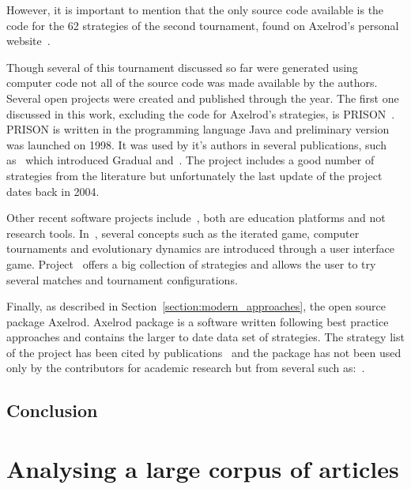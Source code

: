 \documentclass{article}
\theoremstyle{definition}
\begin{document}
However, it is important to mention that the only source code available is the code
for the 62 strategies of the second tournament, found on Axelrod's personal
website~\cite{fortan_code}.

Though several of this tournament discussed so far were generated using computer
code not all of the source code was made available by the authors. Several
open projects were created and published through the year. The first one
discussed in this work, excluding the code for Axelrod's strategies, is 
PRISON~\cite{prison}. PRISON is written in the programming language Java and
preliminary version was launched on 1998. It was used by it's authors in several
publications, such as~\cite{Beaufils1997} which introduced Gradual and~\cite{Beaufils1988}.
The project includes a good number of strategies from the
literature but unfortunately the last update of the project dates back in 2004.

Other recent software projects include~\cite{pd_trust, pd_game}, both are education
platforms and not research tools. In~\cite{pd_trust}, several concepts such as
the iterated game, computer tournaments and evolutionary dynamics are introduced
through a user interface game. Project~\cite{pd_game} offers a big collection of
strategies and allows the user to try several matches and tournament configurations.

Finally, as described in Section~\ref{section:modern_approaches}, the open source
package Axelrod. Axelrod package is a software written following best practice
approaches and contains the larger to date data set of strategies. The strategy
list of the project has been cited by publications~\cite{Neumann2018} and
the package has not been used only by the contributors for academic research but
from several such as:~\cite{Latorre2018}.


\subsection{Conclusion}


\section{Analysing a large corpus of articles}\label{section:analysis}

\end{document}
